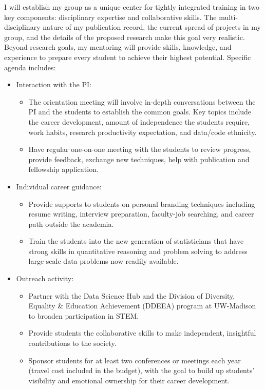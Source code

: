 \documentclass[11pt]{article}
\theoremstyle{exampstyle}
\theoremstyle{definition}
\begin{document}
I will establish my group as a unique center for tightly integrated training in two key components: disciplinary expertise and collaborative skills. The multi-disciplinary nature of my publication record, the current spread of projects in my group, and the details of the proposed research make this goal very realistic. Beyond research goals, my mentoring will provide skills, knowledge, and experience to prepare every student to achieve their highest potential. Specific agenda includes:
\begin{itemize}[wide,labelwidth=!, labelindent=0pt,itemsep=0ex,parsep=0ex,topsep=-3pt]
\item Interaction with the PI:
\begin{itemize}
\item The orientation meeting will involve in-depth conversations between the PI and the students to establish the common goals. Key topics include the career development, amount of independence the students require, work habits, research productivity expectation, and data/code ethnicity.
\item Have regular one-on-one meeting with the students to review progress, provide feedback, exchange new techniques, help with publication and fellowship application.
\end{itemize}
\item Individual career guidance:
\begin{itemize}
\item Provide supports to students on personal branding techniques including resume writing, interview preparation, faculty-job searching, and career path outside the academia.
\item Train the students into the new generation of statisticians that have strong skills in quantitative reasoning and problem solving to address large-scale data problems now readily available.
\end{itemize}
\item Outreach activity:
\begin{itemize}
\item Partner with the Data Science Hub and the Division of Diversity, Equality \& Education Achievement (DDEEA) program at UW-Madison to broaden participation in STEM. 
\item Provide students the collaborative skills to make independent, insightful contributions to the society.
\item Sponsor students for at least two conferences or meetings each year (travel cost included in the budget), with the goal to build up students' visibility and emotional ownership for their career development.   

\end{itemize}
\end{itemize}
\end{document}
